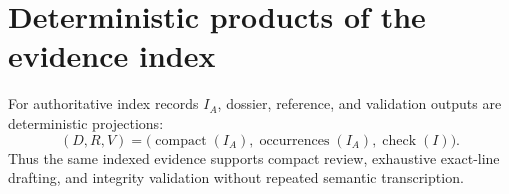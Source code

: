 \documentclass{article}
\begin{document}
\section*{Deterministic products of the evidence index}
For authoritative index records \(I_A\), dossier, reference, and validation outputs are deterministic projections:
\begin{equation}
(D,R,V)=\bigl(\operatorname{compact}(I_A),\operatorname{occurrences}(I_A),\operatorname{check}(I)\bigr).
\label{deriv:init-index-products}
\end{equation}
Thus the same indexed evidence supports compact review, exhaustive exact-line drafting, and integrity validation without repeated semantic transcription.
\end{document}
